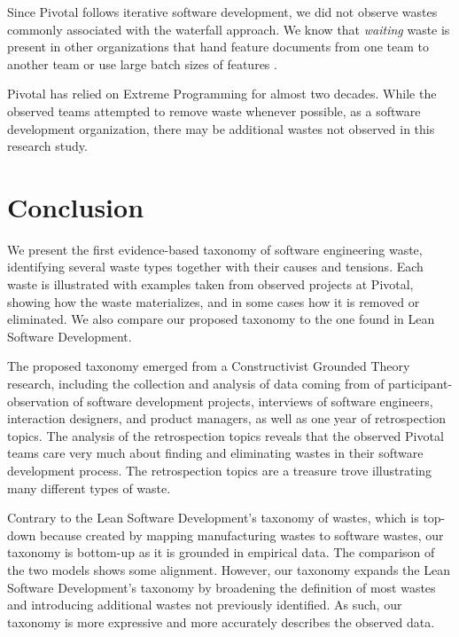 Since Pivotal follows iterative software development, we did not observe wastes commonly associated with the waterfall approach. We know that \textit{waiting} waste is present in other organizations that hand feature documents from one team to another team or use large batch sizes of features \cite{Ali2016, Khurum2014, Mujtaba2010}.

Pivotal has relied on Extreme Programming for almost two decades. While the observed teams  attempted to remove waste whenever possible, as a  software development organization, there may be additional wastes not observed in this research study. 
\section{Conclusion}
\label{Conclusion}
We present the first evidence-based taxonomy of software engineering waste, identifying several waste types together with their causes and tensions. Each waste is illustrated with examples taken from observed projects at Pivotal, showing how the waste materializes, and in some cases how it is removed or eliminated. We also compare our proposed taxonomy to the one found in Lean Software Development.

The proposed taxonomy emerged from a Constructivist Grounded Theory research, including the collection and analysis of data coming from \durationOfResearchStudyPlural{} of participant-observation of \numberOfObservedProjects{} software development projects, interviews of \numberOfInterviews{} software engineers, interaction designers, and product managers, as well as one year of retrospection topics. The analysis of the retrospection topics reveals that the observed Pivotal teams care very much about finding and eliminating wastes in their software development process. The retrospection topics are a treasure trove illustrating many different types of waste. 

Contrary to the Lean Software Development's taxonomy of wastes, which is top-down because created by mapping manufacturing wastes to software wastes, our taxonomy is bottom-up as it is grounded in empirical data. The comparison of the two models shows some alignment. However, our taxonomy expands the Lean Software Development's taxonomy by broadening the definition of most wastes and introducing additional wastes not previously identified. As such, our taxonomy is more expressive and more accurately describes the observed data.




